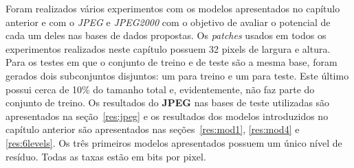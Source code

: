 Foram realizados vários experimentos com os modelos apresentados no capítulo anterior e com o \textit{JPEG} e \textit{JPEG2000} com o objetivo de avaliar o potencial de cada um deles nas bases de dados propostas. Os \textit{patches} usados em todos os experimentos realizados neste capítulo possuem 32 pixels de largura e altura. Para os testes em que o conjunto de treino e de teste são a mesma base, foram gerados dois subconjuntos disjuntos: um para treino e um para teste. Este último possui cerca de 10\% do tamanho total e, evidentemente, não faz parte do conjunto de treino. Os resultados do \textbf{JPEG} nas bases de teste utilizadas são apresentados na seção~\ref{res:jpeg} e os resultados dos modelos introduzidos no capítulo anterior são apresentados nas seções~\ref{res:mod1}, \ref{res:mod4} e \ref{res:6levels}. Os três primeiros modelos apresentados possuem um único nível de resíduo. Todas as taxas estão em bits por pixel.
